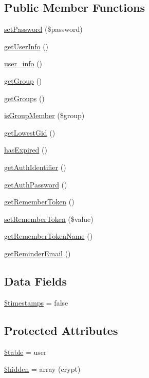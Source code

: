 \subsection*{Public Member Functions}
\begin{DoxyCompactItemize}
\item 
\hyperlink{class_user_a3e35c8d3dbb2c513c618a664389e0926}{set\+Password} (\$password)
\item 
\hyperlink{class_user_a7e7999c3a04f08ffcc5e237fd28a6bc7}{get\+User\+Info} ()
\item 
\hyperlink{class_user_aa46b30b943ae2ca7d95ef7957323e119}{user\+\_\+info} ()
\item 
\hyperlink{class_user_a4f44e7bc9de772c21b4304d11e87bf16}{get\+Group} ()
\item 
\hyperlink{class_user_a6187b4fda76a8055bd08acafa57d9824}{get\+Groups} ()
\item 
\hyperlink{class_user_aa35851c482648545cbd07e896906e52b}{is\+Group\+Member} (\$group)
\item 
\hyperlink{class_user_a1ddbb5a5df1948d9d1d9355cd6b72080}{get\+Lowest\+Gid} ()
\item 
\hyperlink{class_user_ae113778bca25319c9e8e54dfabad273b}{has\+Expired} ()
\item 
\hyperlink{class_user_ae7848376f8338d22d95881223a1e2763}{get\+Auth\+Identifier} ()
\item 
\hyperlink{class_user_ad43a281bd337afd4bce1bc3431dd9fe3}{get\+Auth\+Password} ()
\item 
\hyperlink{class_user_a22fae6645738092bfe0ba9ec9c3ea3a7}{get\+Remember\+Token} ()
\item 
\hyperlink{class_user_a9624734e582b73b9594b7635f4155c16}{set\+Remember\+Token} (\$value)
\item 
\hyperlink{class_user_a113e4794091866b7f0c1c7ddb96f75b3}{get\+Remember\+Token\+Name} ()
\item 
\hyperlink{class_user_a201ae793688e7c4c1dd028475c957631}{get\+Reminder\+Email} ()
\end{DoxyCompactItemize}
\subsection*{Data Fields}
\begin{DoxyCompactItemize}
\item 
\hyperlink{class_user_a51267c24c8fae742ed8f9be0ba6085ee}{\$timestamps} = false
\end{DoxyCompactItemize}
\subsection*{Protected Attributes}
\begin{DoxyCompactItemize}
\item 
\hyperlink{class_user_ae8876a14058f368335baccf35af4a22b}{\$table} = \textquotesingle{}user\textquotesingle{}
\item 
\hyperlink{class_user_a4a374564d2858d8ae869a8fb890aad56}{\$hidden} = array (\textquotesingle{}crypt\textquotesingle{})
\end{DoxyCompactItemize}


